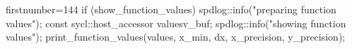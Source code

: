 \begin{cppcode*}{firstnumber=144}
        if (show_function_values) {
            spdlog::info("preparing function values");
            const sycl::host_accessor values{v_buf};
            spdlog::info("showing function values");
            print_function_values(values, x_min, dx, x_precision, y_precision);
        }
\end{cppcode*}

